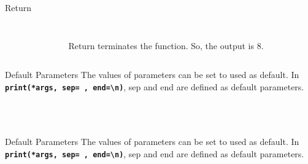         \begin{frame}{Return}
            \begin{columns}
                \begin{column}{0.50\textwidth}
                    \inputminted[frame=single,framesep=2pt, lastline=15]{python3}{code-examples/return2.py}  
                \end{column}
                \begin{column}{0.50\textwidth}
                    \inputminted[frame=single,framesep=2pt, lastline=15]{python3}{code-examples/return3.py}
                    Return terminates the function. So, the output is 8.
                \end{column}
            \end{columns}
        \end{frame}

        \begin{frame}{Default Parameters}
            The values of parameters can be set to used as default.
            \newline
            In \textbf{\texttt{print(*args, sep=\textquotesingle \ \textquotesingle, end=\textquotesingle \textbackslash n\textquotesingle )}}, 
            sep and end are defined as default parameters.
            \inputminted[frame=single,framesep=2pt, lastline=15]{python3}{code-examples/default.py}
            \begin{columns}
                \begin{column}{0.50\textwidth}
                    \inputminted[frame=single,framesep=2pt, lastline=15]{python3}{code-examples/valid1.py}  
                \end{column}
                \begin{column}{0.50\textwidth}
                    \inputminted[frame=single,framesep=2pt, lastline=15]{python3}{code-examples/valid1_1.py}                    
                \end{column}
            \end{columns}
        \end{frame}

        \begin{frame}{Default Parameters}
            The values of parameters can be set to used as default.
            \newline
            In \textbf{\texttt{print(*args, sep=\textquotesingle \ \textquotesingle, end=\textquotesingle \textbackslash n\textquotesingle )}}, 
            sep and end are defined as default parameters.
            \inputminted[frame=single,framesep=2pt, lastline=15]{python3}{code-examples/default.py}
            \inputminted[frame=single,framesep=2pt, lastline=15]{python3}{code-examples/valid2.py}  
        \end{frame}

